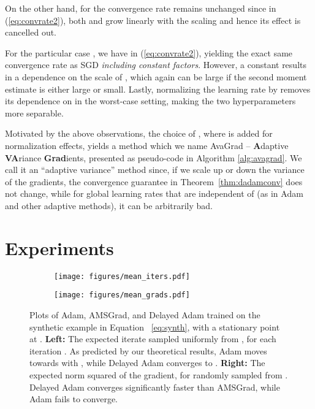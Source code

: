 \documentclass{article}
\newcommand{\thmref}[1]{Theorem~\ref{#1}}
\renewcommand{\eqref}[1]{(\ref{#1})}
\begin{document}
On the other hand, for
 the convergence rate remains unchanged since in \eqref{eq:convrate2}, both  and  grow linearly with the scaling and hence its effect is cancelled out.

For the particular case , we have
 in \eqref{eq:convrate2}, yielding the exact same convergence rate as SGD \emph{including constant factors}. However, a constant
 results in a dependence on the scale of , which
again can be large if the second moment estimate is either large or small.  Lastly, normalizing
the learning rate by  removes its dependence on
 in the worst-case setting, making the two hyperparameters
more separable.

Motivated by the above observations, the choice of , where  is added for normalization effects, yields a method which we name AvaGrad --
\textbf{A}daptive \textbf{VA}riance \textbf{Grad}ients, presented as
pseudo-code in Algorithm \ref{alg:avagrad}.  We call it an
``adaptive variance'' method since, if we scale up or down the variance of the
gradients, the convergence guarantee in
\thmref{thm:dadamconv} does not change, while for global learning rates that are independent of  (as in Adam and other adaptive methods), it can be arbitrarily bad.
 \section{Experiments}
\label{sec:exp}

\begin{figure*}[!bt]
   \centering
   \begin{subfigure}{.5\textwidth}
      \centering
      \texttt{[image: figures/mean\_iters.pdf]}
   \end{subfigure}\hfill
   \begin{subfigure}{.5\textwidth}
      \centering
      \texttt{[image: figures/mean\_grads.pdf]}
   \end{subfigure}
   \caption{
      Plots of Adam, AMSGrad, and Delayed Adam trained on the synthetic
      example in Equation ~\ref{eq:synth}, with a stationary point at
      .
      \textbf{Left:}
         The expected iterate sampled uniformly from ,
         for each iteration . As predicted by our theoretical results, Adam
         moves towards  with , while Delayed
         Adam converges to .
      \textbf{Right:}
         The expected norm squared of the gradient, for  randomly sampled
         from .  Delayed Adam converges significantly
         faster than AMSGrad, while Adam fails to converge.
   }
   \label{fig:synth}
\end{figure*}
 
\end{document}
